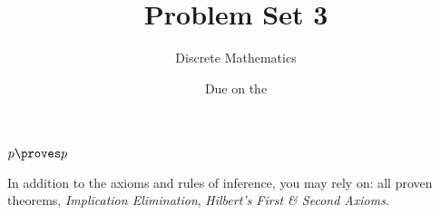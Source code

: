 




\title{Problem Set 3}
\author[Daniel Gonzalez Cedre]{Discrete Mathematics}
\date{Due on the }



\maketitle

$p \proves p$

In addition to the axioms and rules of inference, you may rely on: all proven theorems, \emph{Implication Elimination}, \emph{Hilbert's First \& Second Axioms}.

